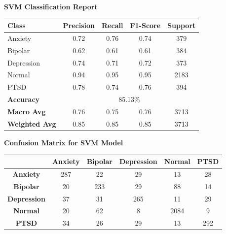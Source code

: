 \begin{center}
    \textbf{SVM Classification Report} \\[0.5em]
    \begin{tabular}{|l|c|c|c|c|}
        \hline
        \textbf{Class} & \textbf{Precision} & \textbf{Recall} & \textbf{F1-Score} & \textbf{Support} \\ \hline
        Anxiety        & 0.72               & 0.76            & 0.74              & 379              \\ \hline
        Bipolar        & 0.62               & 0.61            & 0.61              & 384              \\ \hline
        Depression     & 0.74               & 0.71            & 0.72              & 373              \\ \hline
        Normal         & 0.94               & 0.95            & 0.95              & 2183             \\ \hline
        PTSD           & 0.78               & 0.74            & 0.76              & 394              \\ \hline
        \textbf{Accuracy} & \multicolumn{4}{|c|}{85.13\%} \\ \hline
        \textbf{Macro Avg} & 0.76            & 0.75            & 0.76              & 3713             \\ \hline
        \textbf{Weighted Avg} & 0.85         & 0.85            & 0.85              & 3713             \\ \hline
    \end{tabular}
\end{center}

\vspace{0.25em}

\begin{center}
    \textbf{Confusion Matrix for SVM Model} \\[0.5em]
    \begin{tabular}{|c|c|c|c|c|c|}
        \hline
        & \textbf{Anxiety} & \textbf{Bipolar} & \textbf{Depression} & \textbf{Normal} & \textbf{PTSD} \\ \hline
        \textbf{Anxiety}    & 287 & 22  & 29  & 13  & 28  \\ \hline
        \textbf{Bipolar}    & 20  & 233 & 29  & 88  & 14  \\ \hline
        \textbf{Depression} & 37  & 31  & 265 & 11  & 29  \\ \hline
        \textbf{Normal}     & 20  & 62  & 8   & 2084 & 9  \\ \hline
        \textbf{PTSD}       & 34  & 26  & 29  & 13  & 292 \\ \hline
    \end{tabular}
\end{center}

